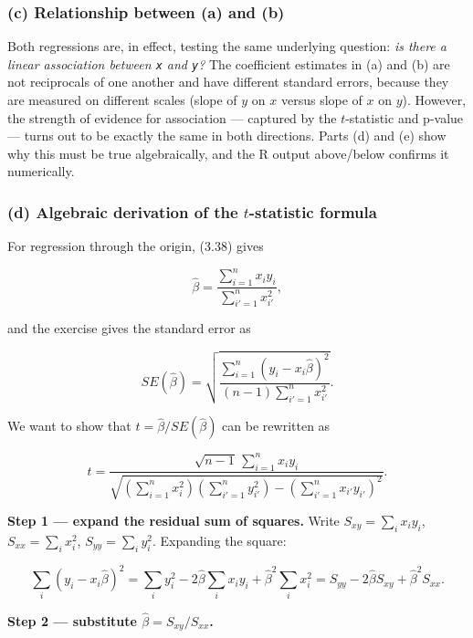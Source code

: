 \documentclass[
  11pt,
]{article}
\begin{document}
\subsubsection{(c) Relationship between (a) and
(b)}\label{c-relationship-between-a-and-b}

Both regressions are, in effect, testing the same underlying question:
\emph{is there a linear association between \texttt{x} and \texttt{y}?}
The coefficient estimates in (a) and (b) are not reciprocals of one
another and have different standard errors, because they are measured on
different scales (slope of \(y\) on \(x\) versus slope of \(x\) on
\(y\)). However, the strength of evidence for association --- captured
by the \(t\)-statistic and p-value --- turns out to be exactly the same
in both directions. Parts (d) and (e) show why this must be true
algebraically, and the R output above/below confirms it numerically.

\subsubsection{\texorpdfstring{(d) Algebraic derivation of the
\(t\)-statistic
formula}{(d) Algebraic derivation of the t-statistic formula}}\label{d-algebraic-derivation-of-the-t-statistic-formula}

For regression through the origin, (3.38) gives

\[
\hat\beta = \frac{\sum_{i=1}^n x_i y_i}{\sum_{i'=1}^n x_{i'}^2},
\]

and the exercise gives the standard error as

\[
SE(\hat\beta) = \sqrt{\dfrac{\sum_{i=1}^n (y_i - x_i \hat\beta)^2}{(n-1)\sum_{i'=1}^n x_{i'}^2}} .
\]

We want to show that \(t = \hat\beta / SE(\hat\beta)\) can be rewritten
as

\[
t = \frac{\sqrt{n-1}\,\sum_{i=1}^n x_i y_i}{\sqrt{\left(\sum_{i=1}^n x_i^2\right)\left(\sum_{i'=1}^n y_{i'}^2\right) - \left(\sum_{i'=1}^n x_{i'} y_{i'}\right)^2}} .
\]

\textbf{Step 1 --- expand the residual sum of squares.} Write
\(S_{xy} = \sum_i x_i y_i\), \(S_{xx} = \sum_i x_i^2\),
\(S_{yy} = \sum_i y_i^2\). Expanding the square:

\[
\sum_i (y_i - x_i\hat\beta)^2 = \sum_i y_i^2 - 2\hat\beta \sum_i x_i y_i + \hat\beta^2 \sum_i x_i^2
= S_{yy} - 2\hat\beta S_{xy} + \hat\beta^2 S_{xx}.
\]

\textbf{Step 2 --- substitute \(\hat\beta = S_{xy}/S_{xx}\).}
\end{document}
